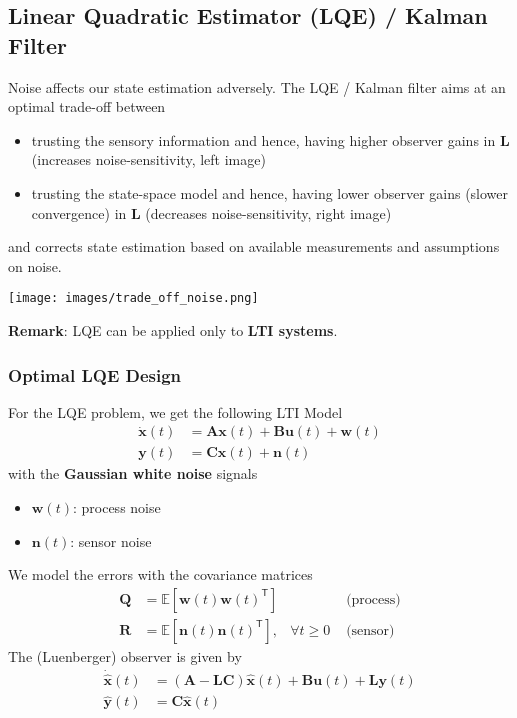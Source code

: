 \subsection{Linear Quadratic Estimator (LQE) / Kalman Filter}\label{obs::LQE}

Noise affects our state estimation adversely. The LQE / Kalman filter aims at an optimal trade-off between
\begin{itemize}
    \item trusting the sensory information and hence, having higher observer gains in $\mathbf{L}$ (increases noise-sensitivity, left image)
    \item trusting the state-space model and hence, having lower observer gains (slower convergence) in $\mathbf{L}$ (decreases noise-sensitivity, right image)
\end{itemize}
and corrects state estimation based on available measurements and assumptions on noise.
\begin{center}
    \texttt{[image: images/trade\_off\_noise.png]}
\end{center}

\textbf{Remark}: LQE can be applied only to \textbf{LTI systems}.\

\subsubsection{Optimal LQE Design}
For the LQE problem, we get the following LTI Model
\begin{align*}
    \dot{\mathbf{x}}(t) & = \mathbf{Ax}(t)+\mathbf{Bu}(t)+\mathbf{w}(t) \\
    \mathbf{y}(t)       & = \mathbf{Cx}(t)+\mathbf{n}(t)
\end{align*}
with the \textbf{Gaussian white noise} signals
\begin{itemize}
    \item $\mathbf{w}(t)$: process noise
    \item $\mathbf{n}(t)$: sensor noise
\end{itemize}
We model the errors with the covariance matrices
\begin{align*}
    \mathbf{Q} & =\mathbb{E}[\mathbf{w}(t){\mathbf{w}(t)}^{\mathsf{T}}]  &                & \text{ (process)} \\
    \mathbf{R} & =\mathbb{E}[\mathbf{n}(t){\mathbf{n}(t)}^{\mathsf{T}}], & \forall t\geq0 & \text{ (sensor)}
\end{align*}
The (Luenberger) observer is given by
\begin{align*}
    \dot{\hat{\textbf{x}}}(t) & =(\mathbf{A}-\mathbf{LC})\hat{\mathbf{x}}(t)+\mathbf{Bu}(t)+\mathbf{Ly}(t) \\
    \hat{\mathbf{y}}(t)       & =\mathbf{C}\hat{\mathbf{x}}(t)
\end{align*}

